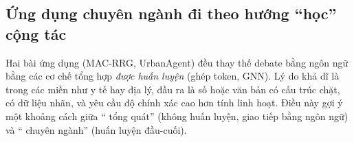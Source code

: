 \subsection{Ứng dụng chuyên ngành đi theo hướng ``học'' cộng tác}
Hai bài ứng dụng (MAC-RRG, UrbanAgent) đều thay thế debate bằng ngôn ngữ bằng các cơ chế tổng hợp \emph{được huấn luyện} (ghép token, GNN). Lý do khả dĩ là trong các miền như y tế hay địa lý, đầu ra là số hoặc văn bản có cấu trúc chặt, có dữ liệu nhãn, và yêu cầu độ chính xác cao hơn tính linh hoạt. Điều này gợi ý một khoảng cách giữa ``\MAS{} tổng quát'' (không huấn luyện, giao tiếp bằng ngôn ngữ) và ``\MAS{} chuyên ngành'' (huấn luyện đầu-cuối).
